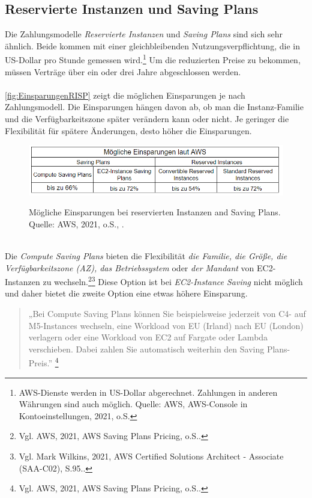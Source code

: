 \subsection{Reservierte Instanzen und Saving Plans}
Die Zahlungsmodelle \textit{Reservierte Instanzen} und \textit{Saving Plans} sind sich sehr ähnlich. Beide kommen mit einer gleichbleibenden  Nutzungsverpflichtung, die in US-Dollar pro Stunde gemessen wird.\footnote{AWS-Dienste werden in US-Dollar abgerechnet. Zahlungen in anderen Währungen sind auch möglich. Quelle: AWS, AWS-Console in Kontoeinstellungen, 2021, o.S.} Um die reduzierten Preise  zu bekommen, müssen Verträge über ein oder drei Jahre abgeschlossen werden. 
\\\\
\autoref{fig:EinsparungenRISP} zeigt die möglichen Einsparungen je nach Zahlungsmodell. Die Einsparungen hängen davon ab, ob man die Instanz-Familie und die Verfügbarkeitszone später verändern kann oder nicht. Je geringer die Flexibilität für spätere Änderungen, desto höher die Einsparungen.
\begin{figure}[h!]
  \centering
  \includegraphics[scale=0.8]{sources/EinsparungenRISP}\label{fig:EinsparungenRISP}\\
  \caption[Mögliche Einsparungen bei reservierten Instanzen and Saving Plans laut AWS]{}
  \label{fig:EinsparungenRISP}
  Mögliche Einsparungen bei reservierten Instanzen and Saving Plans.\\
  Quelle: AWS, 2021, o.S., \cite{AMZ07,AMZ11}.
\end{figure}
\\
Die \textit{Compute Saving Plans} bieten die Flexibilität \textit{die Familie, die Größe, die Verfügbarkeitszone (AZ), das Betriebssystem} oder \textit{der Mandant} von EC2-Instanzen zu wechseln.\footnote{Vgl. AWS, 2021, AWS Saving Plans Pricing, o.S.\cite{AMZ11}.}\footnote{Vgl. Mark Wilkins, 2021, AWS Certified Solutions Architect - Associate (SAA-C02), S.95.\cite{AWS1}.} Diese Option ist bei \textit{EC2-Instance Saving} nicht möglich und daher bietet die zweite Option eine etwas höhere Einsparung.
\begin{quote}
    „Bei Compute Saving Plans können Sie beispielsweise jederzeit von C4- auf M5-Instances wechseln, eine Workload von EU (Irland) nach EU (London) verlagern oder eine Workload von EC2 auf Fargate oder Lambda verschieben. Dabei zahlen Sie automatisch weiterhin den Saving Plans-Preis.”
    \footnote{Vgl. AWS, 2021, AWS Saving Plans Pricing, o.S.\cite{AMZ11}.}
\end{quote}
